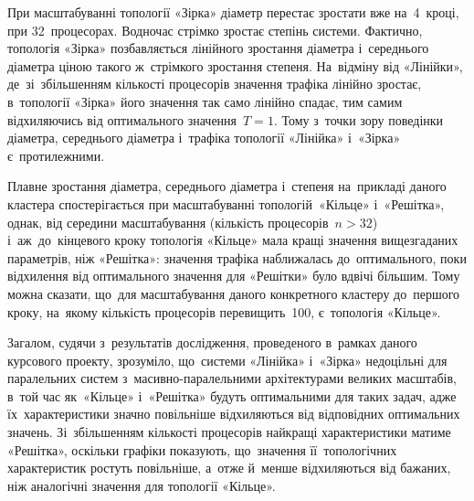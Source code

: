 \documentclass[
	a4paper,
	oneside,
	BCOR = 10mm,
	DIV = 12,
	12pt,
	headings = normal,
]{scrartcl}
\begin{document}
		При масштабуванні топології «Зірка» діаметр перестає зростати вже на~4~кроці, при 32~процесорах. Водночас стрімко зростає степінь системи. Фактично, топологія «Зірка» позбавляється лінійного зростання діаметра і~середнього діаметра ціною такого ж~стрімкого зростання степеня. На~відміну від «Лінійки», де~зі~збільшенням кількості процесорів значення трафіка лінійно зростає, в~топології «Зірка» його значення так само лінійно спадає, тим самим відхиляючись від оптимального значення~$T = 1$. Тому з~точки зору поведінки діаметра, середнього діаметра і~трафіка топології «Лінійка» і~«Зірка» є~протилежними.

		Плавне зростання діаметра, середнього діаметра і~степеня на~прикладі даного кластера спостерігається при масштабуванні топологій~«Кільце» і~«Решітка», однак, від середини масштабування (кількість процесорів~$n > 32$) і~аж~до~кінцевого кроку топологія «Кільце» мала кращі значення вищезгаданих параметрів, ніж «Решітка»: значення трафіка наближалась до~оптимального, поки відхилення від оптимального значення для «Решітки» було вдвічі більшим. Тому можна сказати, що~для масштабування даного конкретного кластеру до~першого кроку, на~якому кількість процесорів перевищить~100, є~топологія «Кільце».

		Загалом, судячи з~результатів дослідження, проведеного в~рамках даного курсового проекту, зрозуміло, що~системи «Лінійка» і~«Зірка» недоцільні для паралельних систем з~масивно-паралельними архітектурами великих масштабів, в~той час як~«Кільце» і~«Решітка» будуть оптимальними для таких задач, адже їх~характеристики значно повільніше відхиляються від відповідних оптимальних значень. Зі~збільшенням кількості процесорів найкращі характеристики матиме «Решітка», оскільки графіки показують, що~значення її~топологічних характеристик ростуть повільніше, а~отже й~менше відхиляються від бажаних, ніж аналогічні значення для топології «Кільце».
\end{document}
